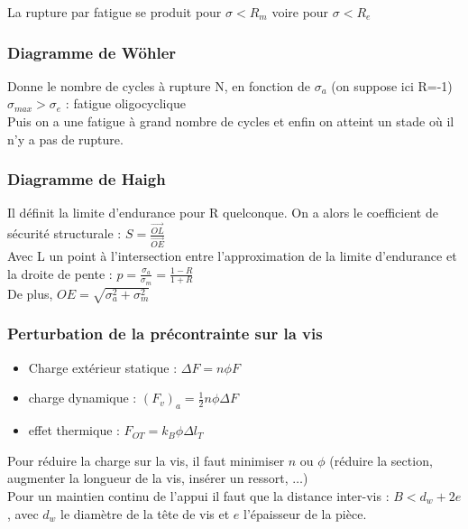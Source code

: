 \documentclass[../main.tex]{subfiles}
\begin{document}
La rupture par fatigue se produit pour $\sigma<R_m$ voire pour $\sigma<R_e$\\

\subsubsection{Diagramme de Wöhler}
Donne le nombre de cycles à rupture N, en fonction de $\sigma_a$ (on suppose ici R=-1)\\
$\sigma_{max}>\sigma_e$ : fatigue oligocyclique\\
Puis on a une fatigue à grand nombre de cycles et enfin on atteint un stade où il n'y a pas de rupture.\\

\subsubsection{Diagramme de Haigh}
Il définit la limite d'endurance pour R quelconque. On a alors le coefficient de sécurité structurale : $S = \frac{\Vec{OL}}{\Vec{OE}}$\\
Avec L un point à l'intersection entre l'approximation de la limite d'endurance et la droite de pente : $p = \frac{\sigma_a}{\sigma_m} = \frac{1-R}{1+R}$\\
De plus, $OE = \sqrt{\sigma_a^2 + \sigma_m^2}$\\

\subsubsection{Perturbation de la précontrainte sur la vis}
\begin{itemize}
    \item Charge extérieur statique : $\Delta F =n \phi F$\\
    \item charge dynamique : $(F_v)_a = \frac{1}{2}n\phi \Delta F$\\
    \item effet thermique : $F_{OT} = k_B \phi \Delta l_T$\\
\end{itemize}
Pour réduire la charge sur la vis, il faut minimiser $n$ ou $\phi$ (réduire la section, augmenter la longueur de la vis, insérer un ressort, $\dots$)\\

Pour un maintien continu de l'appui il faut que la distance inter-vis : $B < d_w + 2e$, avec $d_w$ le diamètre de la tête de vis et $e$ l'épaisseur de la pièce.\\
\end{document}
